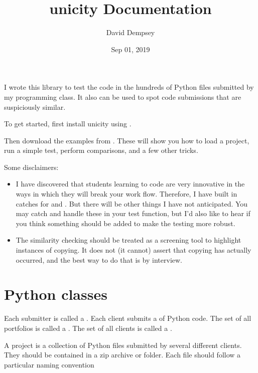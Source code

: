 \documentclass[letterpaper,10pt,english]{sphinxmanual}
\title{unicity Documentation}
\date{Sep 01, 2019}
\author{David Dempsey}
\begin{document}
\maketitle
\sphinxtableofcontents
{}\label{\detokenize{index::doc}}


I wrote this library to test the code in the hundreds of Python files submitted by my programming class. It also can be used to spot code submissions that are suspiciously similar.

To get started, first install unicity using .


Then download the examples from . These will show you how to load a project, run a simple test, perform comparisons, and a few other tricks.

Some disclaimers:
\begin{itemize}
\item {} 
I have discovered that students learning to code are very innovative in the ways in which they will break your work flow. Therefore, I have built in catches for  and . But there will be other things I have not anticipated. You may catch and handle these in your test function, but I’d also like to hear if you think something should be added to make the testing more robust.

\item {} 
The similarity checking should be treated as a screening tool to highlight  instances of copying. It does not (it cannot) assert that copying has actually occurred, and the best way to do that is by interview.

\end{itemize}


\chapter{Python classes}
\label{\detokenize{index:python-classes}}\label{\detokenize{index:what-is-unicity}}
Each submitter is called a . Each client submits a  of Python code. The set of all portfolios is called a . The set of all clients is called a .

A project is a collection of Python files submitted by several different clients. They should be contained in a zip archive or folder. Each file should follow a particular naming convention
\end{document}
